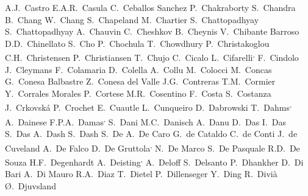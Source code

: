 \begin{flushleft}
A.J.~Castro\And 
E.A.R.~Casula\And 
C.~Ceballos Sanchez\And 
P.~Chakraborty\And 
S.~Chandra\And 
B.~Chang\And 
W.~Chang\And 
S.~Chapeland\And 
M.~Chartier\And 
S.~Chattopadhyay\And 
S.~Chattopadhyay\And 
A.~Chauvin\And 
C.~Cheshkov\And 
B.~Cheynis\And 
V.~Chibante Barroso\And 
D.D.~Chinellato\And 
S.~Cho\And 
P.~Chochula\And 
T.~Chowdhury\And 
P.~Christakoglou\And 
C.H.~Christensen\And 
P.~Christiansen\And 
T.~Chujo\And 
C.~Cicalo\And 
L.~Cifarelli\textsuperscript{,}\And 
F.~Cindolo\And 
J.~Cleymans\And 
F.~Colamaria\And 
D.~Colella\And 
A.~Collu\And 
M.~Colocci\And 
M.~Concas\And 
G.~Conesa Balbastre\And 
Z.~Conesa del Valle\And 
J.G.~Contreras\And 
T.M.~Cormier\And 
Y.~Corrales Morales\And 
P.~Cortese\And 
M.R.~Cosentino\And 
F.~Costa\And 
S.~Costanza\And 
J.~Crkovsk\'{a}\And 
P.~Crochet\And 
E.~Cuautle\And 
L.~Cunqueiro\And 
D.~Dabrowski\And 
T.~Dahms\textsuperscript{,}\And 
A.~Dainese\And 
F.P.A.~Damas\textsuperscript{,}\And 
S.~Dani\And 
M.C.~Danisch\And 
A.~Danu\And 
D.~Das\And 
I.~Das\And 
S.~Das\And 
A.~Dash\And 
S.~Dash\And 
S.~De\And 
A.~De Caro\And 
G.~de Cataldo\And 
C.~de Conti\And 
J.~de Cuveland\And 
A.~De Falco\And 
D.~De Gruttola\textsuperscript{,}\And 
N.~De Marco\And 
S.~De Pasquale\And 
R.D.~De Souza\And 
H.F.~Degenhardt\And 
A.~Deisting\textsuperscript{,}\And 
A.~Deloff\And 
S.~Delsanto\And 
P.~Dhankher\And 
D.~Di Bari\And 
A.~Di Mauro\And 
R.A.~Diaz\And 
T.~Dietel\And 
P.~Dillenseger\And 
Y.~Ding\And 
R.~Divi\`{a}\And 
{\O}.~Djuvsland\And 

\end{flushleft}
